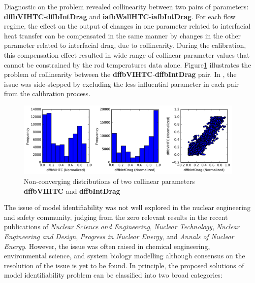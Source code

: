 \documentclass[11pt,titlepage]{article}
\begin{document}
Diagnostic on the problem revealed collinearity between two pairs of 
parameters: \textbf{dffbVIHTC}-\textbf{dffbIntDrag} and 
\textbf{iafbWallHTC}-\textbf{iafbIntDrag}. 
For each flow regime, the effect on the output of changes in one parameter 
related to interfacial heat transfer can be compensated in the same manner 
by changes in the other parameter related to interfacial drag, due to 
collinearity. 
During the calibration, this compensation effect resulted in wide range of 
collinear parameter values that cannot be constrained by the rod temperatures 
data alone. 
Figure\ref{fig:collinear} illustrates the problem of collinearity between the 
\textbf{dffbVIHTC}-\textbf{dffbIntDrag} pair. 
In \cite{Wicaksono2016}, the issue was side-stepped by excluding the less 
influential parameter in each pair from the calibration process.

\begin{figure}[h!]
	\centering
	\includegraphics[scale=0.95]{figures/collinear.png}
	\caption{Non-converging distributions of two collinear parameters
	    \textbf{dffbVIHTC} and \textbf{dffbIntDrag}}
	\label{fig:collinear}
\end{figure}

The issue of model identifiability was not well explored in the nuclear 
engineering and safety community, judging from the zero relevant results 
in the recent publications of \textit{Nuclear Science and Engineering}, 
\textit{Nuclear Technology}, \textit{Nuclear Engineering and Design}, 
\textit{Progress in Nuclear Energy}, and \textit{Annals of Nuclear Energy}. 
However, the issue was often raised in chemical engineering, 
environmental science, and system biology modelling although consensus 
on the resolution of the issue is yet to be found. 
In principle, the proposed solutions of model identifiability problem 
can be classified into two broad categories:
\end{document}
